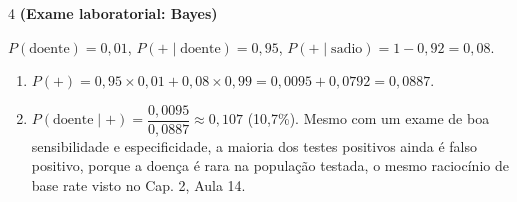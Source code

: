 \documentclass[11pt]{article}
\begin{document}
\begin{questao}{4} \textbf{(Exame laboratorial: Bayes)}
\begin{solucao}
$P(\text{doente})=0{,}01$, $P(+\mid\text{doente})=0{,}95$, $P(+\mid\text{sadio})=1-0{,}92=0{,}08$.
\begin{enumerate}[label=(\alph*)]
  \item $P(+) = 0{,}95\times0{,}01 + 0{,}08\times0{,}99 = 0{,}0095+0{,}0792=0{,}0887$.
  \item $P(\text{doente}\mid+) = \dfrac{0{,}0095}{0{,}0887} \approx 0{,}107$ (10,7\%). Mesmo com um
    exame de boa sensibilidade e especificidade, a maioria dos testes positivos ainda é falso
    positivo, porque a doença é rara na população testada, o mesmo raciocínio de base rate visto
    no Cap. 2, Aula 14.
\end{enumerate}
\end{solucao}
\end{questao}
\end{document}
